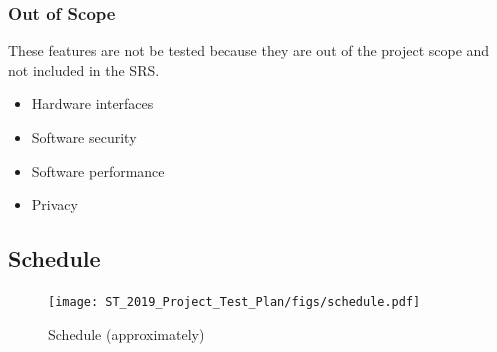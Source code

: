 \documentclass[a4paper]{article}
\begin{document}
\clearpage
\subsubsection{Out of Scope}
These features are not be tested because they are out of the project scope and not included in the SRS.

\begin{itemize}
    \item Hardware interfaces
    \item Software security 
    \item Software performance
    \item Privacy
\end{itemize}


\subsection{Schedule}
\begin{figure}[H]
\centering
    \texttt{[image: ST\_2019\_Project\_Test\_Plan/figs/schedule.pdf]}
    \caption{Schedule (approximately)}
    \label{fig:schedule}
\end{figure}

\clearpage
\end{document}
